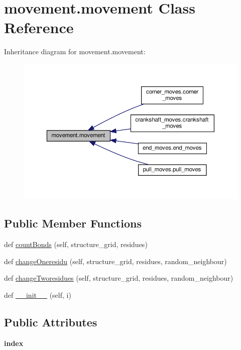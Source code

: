 \hypertarget{classmovement_1_1movement}{}\section{movement.\+movement Class Reference}
\label{classmovement_1_1movement}


Inheritance diagram for movement.\+movement\+:
\nopagebreak
\begin{figure}[H]
\begin{center}
\leavevmode
\includegraphics[width=350pt]{classmovement_1_1movement__inherit__graph}
\end{center}
\end{figure}
\subsection*{Public Member Functions}
\begin{DoxyCompactItemize}
\item 
def \hyperlink{classmovement_1_1movement_aeaf128c02480726c4018c5df71d96813}{count\+Bonds} (self, structure\+\_\+grid, residues)
\item 
def \hyperlink{classmovement_1_1movement_a6d04cb00a64e07aa940a60b726c4f435}{change\+Oneresidu} (self, structure\+\_\+grid, residues, random\+\_\+neighbour)
\item 
def \hyperlink{classmovement_1_1movement_aa403a41df1f55760dd5581c167f03a0c}{change\+Tworesidues} (self, structure\+\_\+grid, residues, random\+\_\+neighbour)
\item 
def \hyperlink{classmovement_1_1movement_acf4e8b0e3c24c68bde44e1d66820dc41}{\+\_\+\+\_\+init\+\_\+\+\_\+} (self, i)
\end{DoxyCompactItemize}
\subsection*{Public Attributes}
\begin{DoxyCompactItemize}
\item 
\mbox{\label{classmovement_1_1movement_a4923d729a062d560c3f549a20569d7e4}} 
{\bfseries index}
\end{DoxyCompactItemize}


